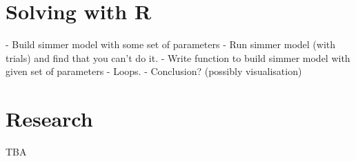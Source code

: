 \section{Solving with R}\label{sec:solving-with-R}

- Build simmer model with some set of parameters
- Run simmer model (with trials) and find that you can't do it.
- Write function to build simmer model with given set of parameters
- Loops.
- Conclusion? (possibly visualisation)

\section{Research}\label{sec:research}

TBA
